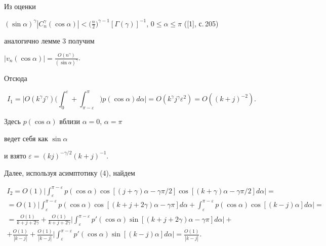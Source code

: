 Из оценки


$(\sin\alpha)^\gamma|C_n^\gamma(\cos\alpha)|<\big(\frac n2\big)^{\gamma-1}


[\Gamma(\gamma)]^{-1}$, $0\le\alpha\le\pi$ ([1], с.\,205)


аналогично лемме 3 получим


$|v_n(\cos\alpha)|=\frac{O(n^\gamma)}{(\sin\alpha)^\gamma}$.


Отсюда


$$


I_1=\bigg|O(k^\gamma j^\gamma)


\bigg(\int_0^\varepsilon+\int_{\pi-\varepsilon}^\pi\bigg)


p(\cos\alpha) d\alpha\bigg| =


O(k^\gamma j^\gamma\varepsilon^2)=O((k+j)^{-2}).


$$


Здесь $p(\cos\alpha)$ вблизи $\alpha=0$, $\alpha=\pi$


ведет себя как $\sin\alpha$


и взято $\varepsilon=(kj)^{-\gamma/2}(k+j)^{-1}$.





Далее, используя асимптотику (4), найдем


\begin{multline*}


I_2=


O(1)\bigg|


\int_\varepsilon^{\pi-\varepsilon}


p(\cos\alpha)\cos[(j+\gamma)\alpha-\gamma\pi/2]


\cos[(k+\gamma)\alpha-\gamma\pi/2] d\alpha\bigg|= \\


%


=O(1)\bigg|


\int_\varepsilon^{\pi-\varepsilon}


p(\cos\alpha)\cos[(k+j+2\gamma)\alpha-\gamma\pi]d\alpha+


\int_\varepsilon^{\pi-\varepsilon}


p(\cos\alpha)\cos[(k-j)\alpha]d\alpha\bigg| = \\


%


=\frac{O(1)}{k+j+2\gamma}+\frac{O(1)}{k+j+2\gamma}\bigg|


\int_\varepsilon^{\pi-\varepsilon}


p'(\cos\alpha)\sin[(k+j+2\gamma)\alpha-\gamma\pi]d\alpha\bigg|+ \\


%


+\frac{O(1)}{|k-j|}+\frac{O(1)}{|k-j|}\bigg|


\int_\varepsilon^{\pi-\varepsilon}


p'(\cos\alpha)\sin[(k-j)\alpha]d\alpha


\bigg|=\frac{O(1)}{|k-j|}.


\end{multline*}






